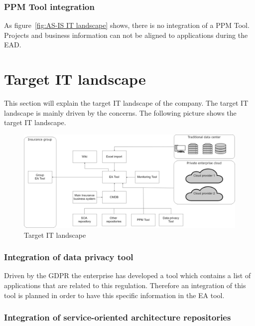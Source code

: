 \subsubsection{PPM Tool integration}

As figure~\ref{fig:AS-IS IT landscape} shows, there is no integration of a PPM Tool. Projects and business information can not be aligned to applications during the EAD.

\section{Target IT landscape}\label{section:targetitlandscape}

This section will explain the target IT landscape of the company. The target IT landscape is mainly driven by the concerns. The following picture shows the target IT landscape.

\begin{figure}[htpb]
  \centering
  \includegraphics[width=1.0\textwidth]{figures/target-it-landscape.png}
  \caption{ Target IT landscape}
  \label{fig:Target IT landscape}
\end{figure}

\subsubsection{Integration of data privacy tool}
Driven by the GDPR the enterprise has developed a tool which contains a list of applications that are related to this regulation. Therefore an integration of this tool is planned in order to have this specific information in the EA tool.

\subsubsection{Integration of service-oriented architecture repositories}

